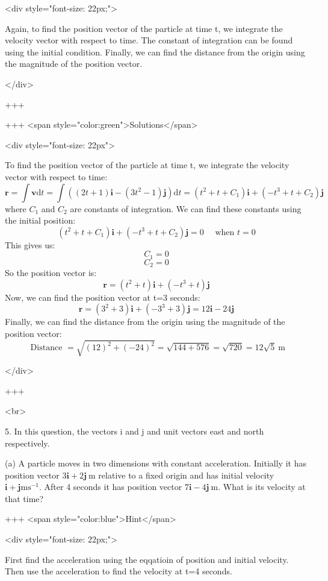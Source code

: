<div style="font-size: 22px;">

Again, to find the position vector of the particle at time t, we integrate the velocity vector with respect to time. The constant of integration can be found using the initial condition. Finally, we can find the distance from the origin using the magnitude of the position vector.

</div>

+++

+++ <span style="color:green">Solutions</span>

<div style="font-size: 22px">

To find the position vector of the particle at time t, we integrate the velocity vector with respect to time:
\[\mathbf{r}=\int \mathbf{v} \mathrm{d} t=\int\left((2 t+1) \mathbf{i}-\left(3 t^{2}-1\right) \mathbf{j}\right) \mathrm{d} t=\left(t^{2}+t+C_{1}\right) \mathbf{i}+\left(-t^{3}+t+C_{2}\right) \mathbf{j}\]
where $C_{1}$ and $C_{2}$ are constants of integration. We can find these constants using the initial position:
\[\left(t^{2}+t+C_{1}\right) \mathbf{i}+\left(-t^{3}+t+C_{2}\right) \mathbf{j}=0 \quad \text { when } t=0\]
This gives us:
\[C_{1}=0\]
\[C_{2}=0\]
So the position vector is:
\[\mathbf{r}=\left(t^{2}+t\right) \mathbf{i}+\left(-t^{3}+t\right) \mathbf{j}\]
Now, we can find the position vector at t=3 seconds:
\[\mathbf{r}=\left(3^{2}+3\right) \mathbf{i}+\left(-3^{3}+3\right) \mathbf{j}=12 \mathbf{i}-24 \mathbf{j}\]
Finally, we can find the distance from the origin using the magnitude of the position vector:
\[\text { Distance }=\sqrt{(12)^{2}+(-24)^{2}}=\sqrt{144+576}=\sqrt{720}=12 \sqrt{5} \mathrm{~m}\]

</div>

+++

<br>

5. In this question, the vectors i and j and unit vectors east and north respectively.

(a) A particle moves in two dimensions with constant acceleration. Initially it has position vector $3 \mathbf{i}+2 \mathbf{j} \mathrm{~m}$ relative to a fixed origin and has initial velocity $\mathbf{i}+\mathbf{j} \mathrm{ms}^{-1}$. After 4 seconds it has position vector $7 \mathbf{i}-4 \mathbf{j} \mathrm{~m}$.
What is its velocity at that time?

+++ <span style="color:blue">Hint</span>

<div style="font-size: 22px;">

First find the acceleration using the eqqatioin of position and initial velocity.
Then use the acceleration to find the velocity at t=4 seconds.

